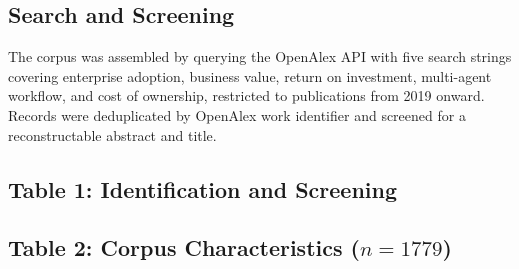 \documentclass[10pt,journal,compsoc,twocolumn]{IEEEtran}
\begin{document}
\subsection{Search and Screening}


The corpus was assembled by querying the OpenAlex API with five search strings covering enterprise adoption, business value, return on investment, multi-agent workflow, and cost of ownership, restricted to publications from 2019 onward. Records were deduplicated by OpenAlex work identifier and screened for a reconstructable abstract and title.


\subsection{Table 1: Identification and Screening}
\begin{table}[htbp]
\centering
{}
\end{table}


\subsection{Table 2: Corpus Characteristics ($n = 1779$)}
\begin{table}[htbp]
\centering
{}
\end{table}
\end{document}
